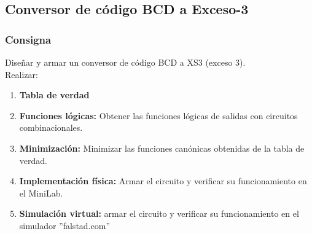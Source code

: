 \subsection{Conversor de código BCD a Exceso-3}
\subsubsection{Consigna}
\sangria{} Diseñar y armar un conversor de código BCD a XS3 (exceso 3). \\
Realizar:
\begin{enumerate}[nosep]
    \item \textbf{Tabla de verdad}
    \item \textbf{Funciones lógicas:} Obtener las funciones lógicas de salidas con circuitos combinacionales.
    \item \textbf{Minimización:} Minimizar las funciones canónicas obtenidas de la tabla de verdad.
    \item \textbf{Implementación física:} Armar el circuito y verificar su funcionamiento en el MiniLab.
    \item \textbf{Simulación virtual:} armar el circuito y verificar su funcionamiento en el simulador ''falstad.com''
\end{enumerate}
